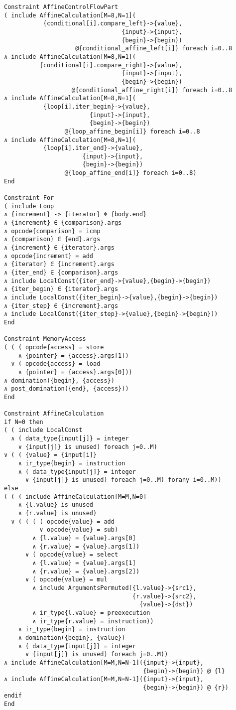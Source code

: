 \begin{lstlisting}[language=CAnDL,basicstyle=\linespread{0.85}\small\ttfamily]
Constraint AffineControlFlowPart
( include AffineCalculation[M=8,N=1](
           {conditional[i].compare_left}->{value},
                                 {input}->{input},
                                 {begin}->{begin})
                    @{conditional_affine_left[i]} foreach i=0..8
∧ include AffineCalculation[M=8,N=1](
          {conditional[i].compare_right}->{value},
                                 {input}->{input},
                                 {begin}->{begin})
                   @{conditional_affine_right[i]} foreach i=0..8
∧ include AffineCalculation[M=8,N=1](
           {loop[i].iter_begin}->{value},
                        {input}->{input},
                        {begin}->{begin})
                 @{loop_affine_begin[i]} foreach i=0..8
∧ include AffineCalculation[M=8,N=1](
           {loop[i].iter_end}->{value},
                      {input}->{input},
                      {begin}->{begin})
                 @{loop_affine_end[i]} foreach i=0..8)
End

Constraint For
( include Loop
∧ {increment} -> {iterator} Φ {body.end}
∧ {increment} ∈ {comparison}.args
∧ opcode{comparison} = icmp
∧ {comparison} ∈ {end}.args
∧ {increment} ∈ {iterator}.args
∧ opcode{increment} = add
∧ {iterator} ∈ {increment}.args
∧ {iter_end} ∈ {comparison}.args
∧ include LocalConst({iter_end}->{value},{begin}->{begin})
∧ {iter_begin} ∈ {iterator}.args
∧ include LocalConst({iter_begin}->{value},{begin}->{begin})
∧ {iter_step} ∈ {increment}.args
∧ include LocalConst({iter_step}->{value},{begin}->{begin}))
End

Constraint MemoryAccess
( ( ( opcode{access} = store
    ∧ {pointer} = {access}.args[1])
  ∨ ( opcode{access} = load
    ∧ {pointer} = {access}.args[0]))
∧ domination({begin}, {access})
∧ post_domination({end}, {access}))
End

Constraint AffineCalculation
if N=0 then
( ( include LocalConst
  ∧ ( data_type{input[j]} = integer
    ∨ {input[j]} is unused) foreach j=0..M)
∨ ( ( {value} = {input[i]}
    ∧ ir_type{begin} = instruction
    ∧ ( data_type{input[j]} = integer
      ∨ {input[j]} is unused) foreach j=0..M) forany i=0..M))
else
( ( ( include AffineCalculation[M=M,N=0]
    ∧ {l.value} is unused
    ∧ {r.value} is unused)
  ∨ ( ( ( ( opcode{value} = add
          ∨ opcode{value} = sub)
        ∧ {l.value} = {value}.args[0]
        ∧ {r.value} = {value}.args[1])
      ∨ ( opcode{value} = select
        ∧ {l.value} = {value}.args[1]
        ∧ {r.value} = {value}.args[2])
      ∨ ( opcode{value} = mul
        ∧ include ArgumentsPermuted({l.value}->{src1},
                                    {r.value}->{src2},
                                      {value}->{dst})
        ∧ ir_type{l.value} = preexecution
        ∧ ir_type{r.value} = instruction))
    ∧ ir_type{begin} = instruction
    ∧ domination({begin}, {value})
    ∧ ( data_type{input[j]} = integer
      ∨ {input[j]} is unused) foreach j=0..M))
∧ include AffineCalculation[M=M,N=N-1]({input}->{input},
                                       {begin}->{begin}) @ {l}
∧ include AffineCalculation[M=M,N=N-1]({input}->{input},
                                       {begin}->{begin}) @ {r})
endif
End


\end{lstlisting}

